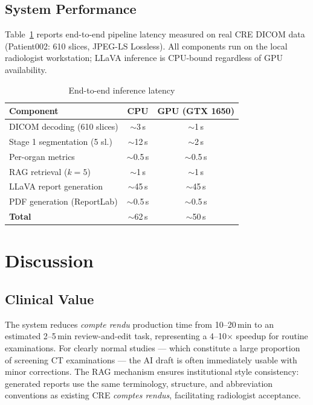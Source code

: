 \documentclass[conference]{IEEEtran}
\begin{document}
\subsection{System Performance}

Table~\ref{tab:perf} reports end-to-end pipeline latency measured on real CRE
DICOM data (Patient002: 610 slices, JPEG-LS Lossless). All components run on
the local radiologist workstation; LLaVA inference is CPU-bound regardless of
GPU availability.

\begin{table}[h]
\caption{End-to-end inference latency}
\label{tab:perf}
\centering
\renewcommand{\arraystretch}{1.15}
\begin{tabular}{lcc}
\toprule
\textbf{Component} & \textbf{CPU} & \textbf{GPU (GTX 1650)} \\
\midrule
DICOM decoding (610 slices)   & $\sim$3\,s   & $\sim$1\,s \\
Stage 1 segmentation (5 sl.)  & $\sim$12\,s  & $\sim$2\,s \\
Per-organ metrics              & $\sim$0.5\,s & $\sim$0.5\,s \\
RAG retrieval ($k\!=\!5$)      & $\sim$1\,s   & $\sim$1\,s \\
LLaVA report generation       & $\sim$45\,s  & $\sim$45\,s \\
PDF generation (ReportLab)    & $\sim$0.5\,s & $\sim$0.5\,s \\
\midrule
\textbf{Total}                 & $\sim$62\,s  & $\sim$50\,s \\
\bottomrule
\end{tabular}
\end{table}

\section{Discussion}

\subsection{Clinical Value}
The system reduces \textit{compte rendu} production time from 10--20\,min to
an estimated 2--5\,min review-and-edit task, representing a 4--10$\times$
speedup for routine examinations. For clearly normal studies --- which
constitute a large proportion of screening CT examinations --- the AI draft
is often immediately usable with minor corrections. The RAG mechanism ensures
institutional style consistency: generated reports use the same terminology,
structure, and abbreviation conventions as existing CRE \textit{comptes rendus},
facilitating radiologist acceptance.
\end{document}
